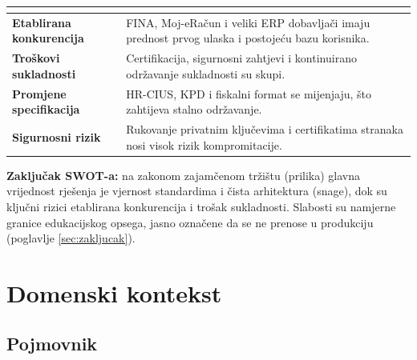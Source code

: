 \documentclass[11pt,a4paper]{article}
\begin{document}
\begin{tabularx}{\textwidth}{@{}>{\bfseries}l Y@{}}
\toprule
{} \\
\midrule
Etablirana konkurencija & FINA, Moj-eRačun i veliki ERP dobavljači imaju prednost prvog ulaska i postojeću bazu korisnika. \\
Troškovi sukladnosti & Certifikacija, sigurnosni zahtjevi i kontinuirano održavanje sukladnosti su skupi. \\
Promjene specifikacija & HR-CIUS, KPD i fiskalni format se mijenjaju, što zahtijeva stalno održavanje. \\
Sigurnosni rizik & Rukovanje privatnim ključevima i certifikatima stranaka nosi visok rizik kompromitacije. \\
\bottomrule
\end{tabularx}
\renewcommand{\arraystretch}{1}

\textbf{Zaključak SWOT-a:} na zakonom zajamčenom tržištu (prilika) glavna vrijednost rješenja je
vjernost standardima i čista arhitektura (snage), dok su ključni rizici etablirana
konkurencija i trošak sukladnosti. Slabosti su namjerne granice edukacijskog
opsega, jasno označene da se ne prenose u produkciju (poglavlje \ref{sec:zakljucak}).

\section{Domenski kontekst}

\subsection{Pojmovnik}
\end{document}
